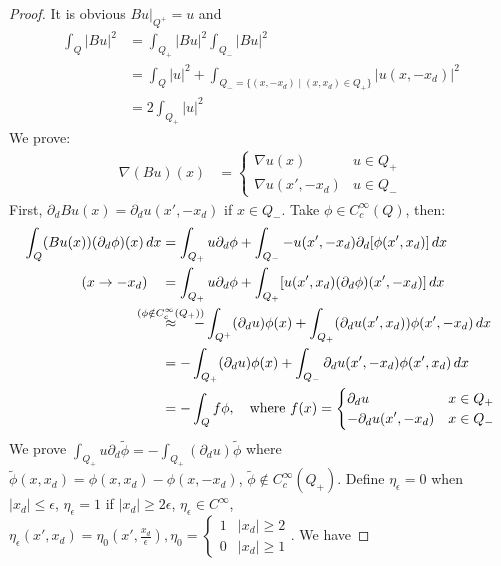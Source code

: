 \documentclass{report}
\theoremstyle{tommy}
\begin{document}
  \begin{proof}
    It is obvious \(Bu|_{Q^+} = u\) and
    \begin{align*}
      \int_Q|Bu|^2 
      &= \int_{Q_+} |Bu|^2  \int_{Q_-}|Bu|^2 \\
      &= \int_Q |u|^2 + \int_{Q_- = \{(x,-x_d) \mid (x,x_d) \in Q_+\}} |u(x,-x_d)|^2 \\
      &= 2 \int_{Q_+} |u|^2
    \end{align*}
    We prove:
    \begin{align*}
      \nabla (Bu)(x) &= \begin{cases}
        \nabla u(x) & u \in Q_+ \\ \nabla u(x', -x_d) & u \in Q_-
      \end{cases}
    \end{align*}
    First, \(\partial_d Bu(x) = \partial_d u(x', -x_d)\) if \(x \in Q_-\). Take \(\phi \in C_c^\infty(Q)\), then:
    \begin{align*}
      \int_Q (Bu(x)) (\partial_d \phi) (x) \, dx 
      &= \int_{Q_+} u \partial_d \phi + \int_{Q_-} - u(x', -x_d) \partial_d [\phi(x', x_d)] \, dx \\
      (x \to -x_d) \quad &= \int_{Q_+} u \partial_d \phi + \int_{Q_+}[u(x', x_d) (\partial_d \phi) (x', -x_d)]\, dx \\
      &\overset{\mathclap{(\phi \notin C_c^\infty(Q_+))}}\approx \quad - \int_{Q^+} (\partial_d u) \phi(x) + \int_{Q_+}(\partial_d u (x', x_d)) \phi(x', -x_d) \, dx \\
      &= - \int_{Q_+} (\partial_d u) \phi(x) + \int_{Q_-} \partial_d u(x', -x_d) \phi(x', x_d) \, dx \\
      &= - \int_Q f \phi, \quad \text{where \(f(x) = \begin{cases}
        \partial_d u & x \in Q_+ \\ - \partial_d u(x',-x_d) & x \in Q_-
      \end{cases}\)} 
    \end{align*}
    We prove \(\int_{Q_+} u \partial_d \tilde \phi = - \int_{Q_+} (\partial_d u) \tilde \phi\) where \(\tilde \phi(x,x_d) = \phi(x,x_d) - \phi(x, -x_d)\), \(\tilde \phi \notin C_c^\infty(Q_+)\). Define \(\eta_\epsilon = 0\) when \(|x_d| \le \epsilon\), \(\eta_\epsilon = 1\) if \(|x_d| \ge 2 \epsilon\), \(\eta_\epsilon \in C^\infty\), \(\eta_\epsilon(x', x_d) = \eta_0(x', \frac{x_d}{\epsilon}), \eta_0 = \begin{cases}
      1 & |x_d| \ge 2 \\ 0 & |x_d| \ge 1\end{cases}\). We have 

\end{proof}
\end{document}
